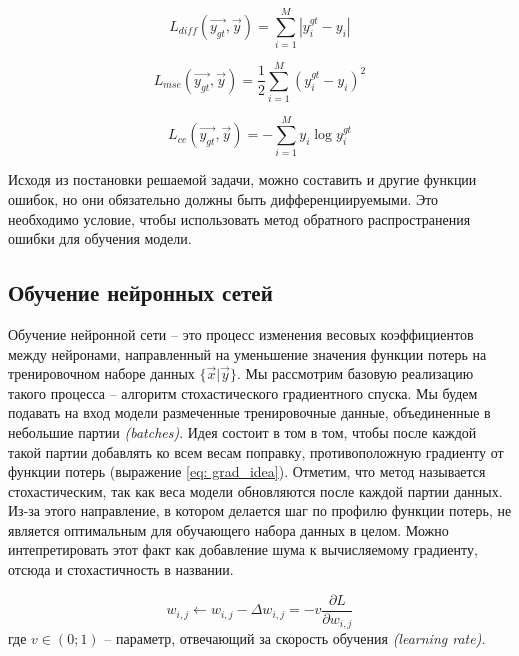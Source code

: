 \begin{equation}\label{eq:diff}
    L_{diff}(\vec{y_{gt}}, \vec{y}) = \sum_{i=1}^M | y^{gt}_{i} - y_{i} |
\end{equation}

\begin{equation}\label{eq: se}
    L_{mse}(\vec{y_{gt}}, \vec{y}) = \frac{1}{2} \sum_{i=1}^M (y^{gt}_{i} - y_{i})^2
\end{equation}

\begin{equation}\label{eq: cross_entropy}
    L_{ce}(\vec{y_{gt}}, \vec{y}) = - \sum_{i=1}^M y_{i} \log{y^{gt}_{i}}
\end{equation}

\indent
\indent
Исходя из постановки решаемой задачи, можно составить и другие функции ошибок, но
они обязательно должны быть дифференциируемыми.
Это необходимо условие, чтобы использовать метод обратного распространения
ошибки для обучения модели.


\subsection{Обучение нейронных сетей}

\indent
\indent
Обучение нейронной сети -- это процесс изменения весовых
коэффициентов между нейронами, направленный на уменьшение
 значения функции потерь на тренировочном наборе данных $\{ \vec{x} | \vec{y} \}$. 
 Мы рассмотрим базовую реализацию такого процесса -- алгоритм 
 стохастического градиентного спуска. Мы будем подавать на вход модели
 размеченные тренировочные данные, объединенные в  небольшие партии 
 \textit{(batches)}. Идея состоит в том в том, чтобы после каждой такой партии
добавлять ко всем весам поправку, противоположную градиенту от функции потерь
(выражение \ref{eq: grad_idea}). 
Отметим, что метод называется стохастическим, так как веса 
модели обновляются после каждой партии данных. Из-за этого
направление, в котором делается шаг по профилю функции потерь,
не является оптимальным для обучающего набора данных в целом.
Можно интепретировать этот факт как добавление шума
к вычисляемому градиенту, отсюда и стохастичность в названии.


\begin{equation}\label{eq: grad_idea}
    w_{i, j} \leftarrow w_{i, j} - \Delta w_{i,j} = - v \frac{\partial L}{\partial w_{i, j}}
\end{equation}
где $v \in (0; 1)$ -- параметр, отвечающий за скорость обучения \textit{(learning rate)}.

